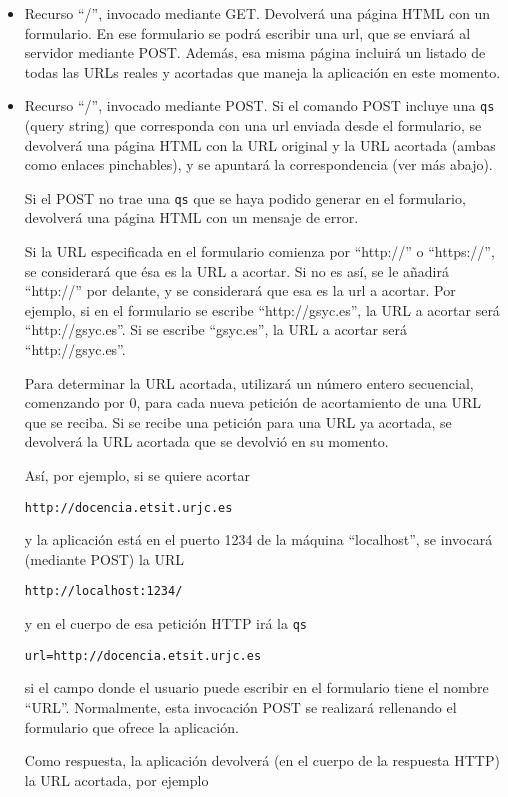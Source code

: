 \begin{itemize}
\item Recurso ``/'', invocado mediante GET. Devolverá una página HTML con un formulario. En ese formulario se podrá escribir una url, que se enviará al servidor mediante POST. Además, esa misma página incluirá un listado de todas las URLs reales y acortadas que maneja la aplicación en este momento.

\item Recurso ``/'', invocado mediante POST. Si el comando POST incluye una \texttt{qs} (query string) que corresponda con una url enviada desde el formulario, se devolverá una página HTML con la URL original y la URL acortada (ambas como enlaces pinchables), y se apuntará la correspondencia (ver más abajo).

Si el POST no trae una \texttt{qs} que se haya podido generar en el formulario, devolverá una página HTML con un mensaje de error.

Si la URL especificada en el formulario comienza por ``http://'' o ``https://'', se considerará que ésa es la URL a acortar. Si no es así, se le añadirá ``http://'' por delante, y se considerará que esa es la url a acortar. Por ejemplo, si en el formulario se escribe ``http://gsyc.es'', la URL a acortar será ``http://gsyc.es''. Si se escribe ``gsyc.es'', la URL a acortar será ``http://gsyc.es''.

Para determinar la URL acortada, utilizará un número entero secuencial, comenzando por 0, para cada nueva petición de acortamiento de una URL que se reciba. Si se recibe una petición para una URL ya acortada, se devolverá la URL acortada que se devolvió en su momento.

Así, por ejemplo, si se quiere acortar

\verb|http://docencia.etsit.urjc.es|

y la aplicación está en el puerto 1234 de la máquina ``localhost'', se invocará (mediante POST) la URL

\verb|http://localhost:1234/|

y en el cuerpo de esa petición HTTP irá la \texttt{qs}

\verb|url=http://docencia.etsit.urjc.es|

si el campo donde el usuario puede escribir en el formulario tiene el nombre ``URL''. Normalmente, esta invocación POST se realizará rellenando el formulario que ofrece la aplicación.

Como respuesta, la aplicación devolverá (en el cuerpo de la respuesta HTTP) la URL acortada, por ejemplo


\end{itemize}
